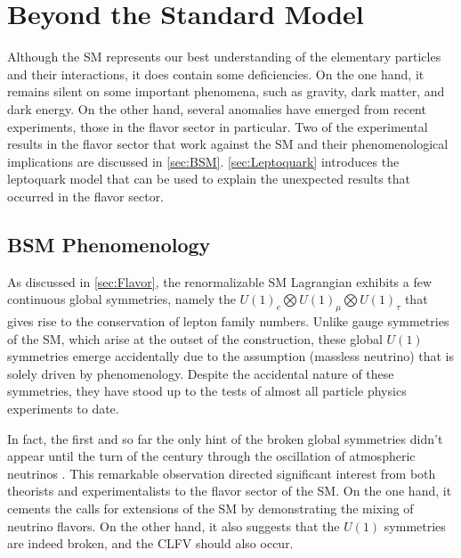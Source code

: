 \chapter{Beyond the Standard Model}
\label{chap:BSM}

Although the \ac{SM} represents our best understanding of the elementary particles and their interactions, it does contain some deficiencies. On the one hand, it remains silent on some important phenomena, such as gravity, dark matter, and dark energy. On the other hand, several anomalies have emerged from recent experiments, those in the flavor sector in particular. Two of the experimental results in the flavor sector that work against the \ac{SM} and their phenomenological implications are discussed in \autoref{sec:BSM}. \autoref{sec:Leptoquark} introduces the leptoquark model that can be used to explain the unexpected results that occurred in the flavor sector.

\section{BSM Phenomenology}
\label{sec:BSM}

As discussed in \autoref{sec:Flavor}, the renormalizable \ac{SM} Lagrangian exhibits a few continuous global symmetries, namely the $U(1)_{e}\bigotimes U(1)_{\mu}\bigotimes U(1)_{\tau}$ that gives rise to the conservation of lepton family numbers. Unlike gauge symmetries of the \ac{SM}, which arise at the outset of the construction, these global $U(1)$ symmetries emerge accidentally due to the assumption (massless neutrino) that is solely driven by phenomenology. Despite the accidental nature of these symmetries, they have stood up to the tests of almost all particle physics experiments to date.  

In fact, the first and so far the only hint of the broken global symmetries didn't appear until the turn of the century through the oscillation of atmospheric neutrinos \cite{Super-Kamiokande:1998kpq,SNO:2002tuh}. This remarkable observation directed significant interest from both theorists and experimentalists to the flavor sector of the \ac{SM}. On the one hand, it cements the calls for extensions of the \ac{SM} by demonstrating the mixing of neutrino flavors. On the other hand, it also suggests that the $U(1)$ symmetries are indeed broken, and the \ac{CLFV} should also occur. 

